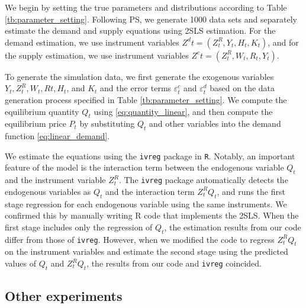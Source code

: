 \documentclass[11pt, a4paper]{article}
\begin{document}
We begin by setting the true parameters and distributions according to Table \ref{tb:parameter_setting}. Following PS, we generate 1000 data sets and separately estimate the demand and supply equations using 2SLS estimation. For the demand estimation, we use instrument variables $Z^{d}{t} = (Z^{R}_{t}, Y_t, H_{t}, K_{t})$, and for the supply estimation, we use instrument variables $Z^{c}{t} = (Z^{R}_{t}, W_{t}, R_{t}, Y_t)$.

To generate the simulation data, we first generate the exogenous variables $Y_t, Z^{R}_{t}, W_t, R{t}, H_t$, and $K_t$ and the error terms $\varepsilon_{t}^c$ and $\varepsilon_{t}^d$ based on the data generation process specified in Table \ref{tb:parameter_setting}. We compute the equilibrium quantity $Q_{t}$ using \eqref{eq:quantity_linear}, and then compute the equilibrium price $P_t$ by substituting $Q_{t}$ and other variables into the demand function \eqref{eq:linear_demand}.

We estimate the equations using the \texttt{ivreg} package in \texttt{R}. Notably, an important feature of the model is the interaction term between the endogenous variable $Q_{t}$ and the instrument variable $Z^{R}_{t}$. The \texttt{ivreg} package automatically detects the endogenous variables as $Q_{t}$ and the interaction term $Z^{R}_{t}Q_{t}$, and runs the first stage regression for each endogenous variable using the same instruments. We confirmed this by manually writing R code that implements the 2SLS. When the first stage includes only the regression of $Q_{t}$, the estimation results from our code differ from those of \texttt{ivreg}. However, when we modified the code to regress $Z^{R}_{t}Q_{t}$ on the instrument variables and estimate the second stage using the predicted values of $Q_{t}$ and $Z^{R}_{t}Q_{t}$, the results from our code and \texttt{ivreg} coincided.


\subsection{Other experiments}
\end{document}
